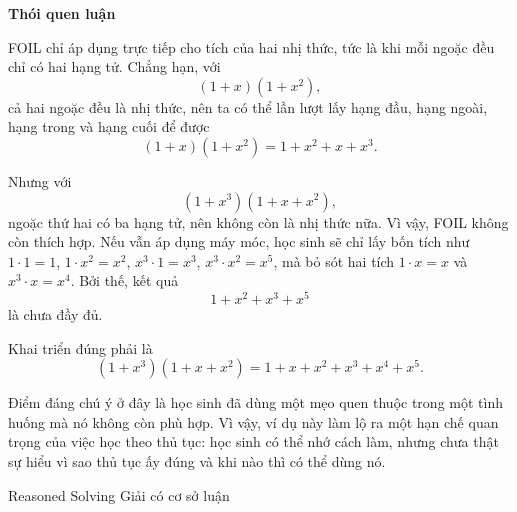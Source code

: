 {    \begin{hanglist}
      \vspace{\baselineskip}

      \vspace{\baselineskip}
    \end{hanglist}    

    \textbf{Thói quen luận}

    \begin{hanglist}

      \vspace{\baselineskip}

    \end{hanglist}    
  }
  {
    \vspace{.5\baselineskip}
    FOIL chỉ áp dụng trực tiếp cho tích của hai nhị thức, tức là khi mỗi ngoặc đều chỉ có hai hạng tử. Chẳng hạn, với
    $$
    (1+x)(1+x^2),
    $$
    cả hai ngoặc đều là nhị thức, nên ta có thể lần lượt lấy hạng đầu, hạng ngoài, hạng trong và hạng cuối để được
    $$
    (1+x)(1+x^2)=1+x^2+x+x^3.
    $$

    Nhưng với
    $$
    (1+x^3)(1+x+x^2),
    $$
    ngoặc thứ hai có ba hạng tử, nên không còn là nhị thức nữa. Vì vậy, FOIL không còn thích hợp. Nếu vẫn áp dụng máy móc, học sinh sẽ chỉ lấy bốn tích như $1\cdot1=1$, $1\cdot x^2=x^2$, $x^3\cdot1=x^3$, $x^3\cdot x^2=x^5$, mà bỏ sót hai tích $1\cdot x=x$ và $x^3\cdot x=x^4$. Bởi thế, kết quả
    $$
    1+x^2+x^3+x^5
    $$
    là chưa đầy đủ.

    Khai triển đúng phải là
    $$
    (1+x^3)(1+x+x^2)=1+x+x^2+x^3+x^4+x^5.
    $$

    Điểm đáng chú ý ở đây là học sinh đã dùng một mẹo quen thuộc trong một tình huống mà nó không còn phù hợp. Vì vậy, ví dụ này làm lộ ra một hạn chế quan trọng của việc học theo thủ tục: học sinh có thể nhớ cách làm, nhưng chưa thật sự hiểu vì sao thủ tục ấy đúng và khi nào thì có thể dùng nó.
  }

\ParallelSection
  {Reasoned Solving}
  {Giải có cơ sở luận}
  {}

